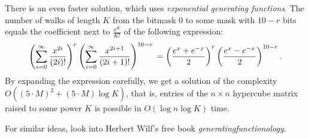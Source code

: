 There is an even faster solution, which uses \textit{exponential generating
functions}. The number of walks of length $K$ from the bitmask $0$ to some mask
with $10-r$ bits equals the coefficient next to $\frac{x^K}{K!}$ of the
following expression:
\[
  \left(\sum_{i=0}^{\infty} \frac{x^{2i}}{(2i)!}\right)^{r}
  \left(\sum_{i=0}^{\infty} \frac{x^{2i+1}}{(2i+1)!}\right)^{10-r} \\
  = \left( \frac{e^x + e^{-x}}{2} \right)^{r}
  \left( \frac{e^x - e^{-x}}{2} \right)^{10-r}.
\]
By expanding the expression carefully, we get a solution of the complexity   
$O((5\cdot M)^2 + (5\cdot M) \log K)$, that is, entries of the $n \times n$
hypercube matrix raised to some power $K$ is possible in $O(\log n \log K)$ 
time.

For similar ideas, look into Herbert Wilf's free book
\textit{generatingfunctionology}.

